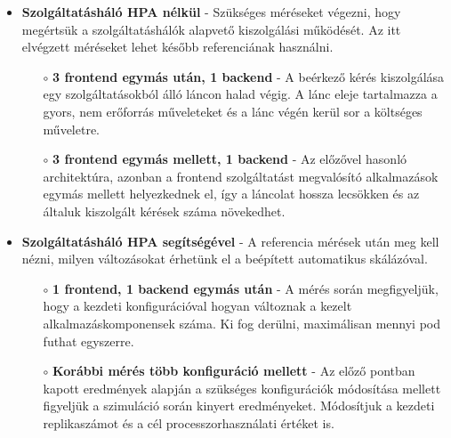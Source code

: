 \begin{itemize}
	\item \textbf{Szolgáltatásháló HPA nélkül} - Szükséges méréseket végezni, hogy megértsük a szolgáltatáshálók alapvető kiszolgálási működését. Az itt elvégzett méréseket lehet később referenciának használni.
	\begin{itemize}
		\item[$\circ$] \textbf{3 frontend egymás után, 1 backend} - A beérkező kérés kiszolgálása  egy szolgáltatásokból álló láncon halad végig. A lánc eleje tartalmazza a gyors, nem erőforrás műveleteket és a lánc végén kerül sor a költséges műveletre. 
		
		\item[$\circ$] \textbf{3 frontend egymás mellett, 1 backend} - Az előzővel hasonló architektúra, azonban a frontend szolgáltatást megvalósító alkalmazások egymás mellett helyezkednek el, így a láncolat hossza lecsökken és az általuk kiszolgált kérések száma növekedhet.
	\end{itemize}
	
	\item \textbf{Szolgáltatásháló HPA segítségével} - A referencia mérések után meg kell nézni, milyen változásokat érhetünk el a beépített automatikus skálázóval.
	
	\begin{itemize}
		\item[$\circ$] \textbf{1 frontend, 1 backend egymás után} - A mérés során megfigyeljük, hogy a kezdeti konfigurációval hogyan változnak a kezelt alkalmazáskomponensek száma. Ki fog derülni, maximálisan mennyi pod futhat egyszerre. 
		
		\item[$\circ$] \textbf{Korábbi mérés több konfiguráció mellett} - Az előző pontban kapott eredmények alapján a szükséges konfigurációk módosítása mellett figyeljük a szimuláció során kinyert eredményeket. Módosítjuk a kezdeti replikaszámot és a cél processzorhasználati értéket is.
		
	\end{itemize}
	
\end{itemize}


